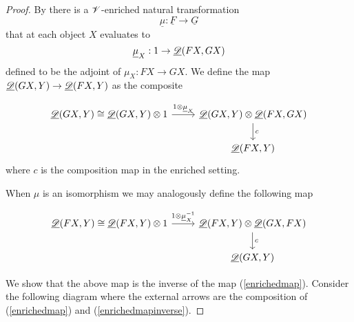 \documentclass[Thesis.tex]{subfiles}
\begin{document}
\begin{proof}
By  there is a $\mathscr{V}$-enriched natural transformation 
\[\underline{\mu}:\underline{F}\to\underline{G}\]
that at each object $X$ evaluates to \[\underline{\mu}_X:1\to\underline{\mathscr{D}}(FX,GX)\] defined to be the adjoint of $\mu_X:FX\to GX$. We define the map $\underline{\mathscr{D}}(GX,Y)\to\underline{\mathscr{D}}(FX,Y)$ as the composite

\begin{equation}\label{enrichedmap}
\begin{tikzcd}
\uD(GX,Y)\cong\uD(GX,Y)\otimes 1\arrow[r,"1\otimes\umu_X"]&\uD(GX,Y)\otimes\uD(FX,GX)\arrow[d, "c"]\\ 
& \uD(FX,Y)
\end{tikzcd}
\end{equation}
where $c$ is the composition map in the enriched setting. 

When $\mu$ is an isomorphism we may analogously define the following map

\begin{equation}\label{enrichedmapinverse}
\begin{tikzcd}
\uD(FX,Y)\cong\uD(FX,Y)\otimes 1\arrow[r,"1\otimes\umui_X"]&\uD(FX,Y)\otimes\uD(GX,FX)\arrow[d, "c"]\\ 
& \uD(GX,Y)
\end{tikzcd}
\end{equation}

We show that the above map is the inverse of the map (\ref{enrichedmap}). Consider the following diagram where the external arrows are the composition of (\ref{enrichedmap}) and (\ref{enrichedmapinverse}).


\end{proof}
\end{document}
